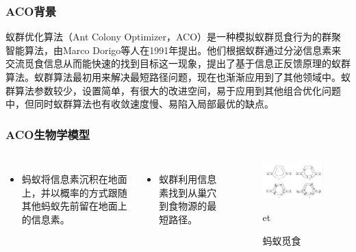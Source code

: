 \begin{frame}
	\frametitle{ACO背景}
	蚁群优化算法（Ant Colony Optimizer，ACO）是一种模拟蚁群觅食行为的群聚智能算法，由Marco Dorigo等人在1991年提出。他们根据蚁群通过分泌信息素来交流觅食信息从而能快速的找到目标这一现象，提出了基于信息正反馈原理的蚁群算法。蚁群算法最初用来解决最短路径问题，现在也渐渐应用到了其他领域中。蚁群算法参数较少，设置简单，有很大的改进空间，易于应用到其他组合优化问题中，但同时蚁群算法也有收敛速度慢、易陷入局部最优的缺点。
\end{frame}


\begin{frame}
	\frametitle{ACO生物学模型}
	\begin{columns}
			\begin{itemize}
				\item{蚂蚁将信息素沉积在地面上，并以概率的方式跟随其他蚂蚁先前留在地面上的信息素。}
			\end{itemize}
			\begin{itemize}
				\item{蚁群利用信息素找到从巢穴到食物源的最短路径。}
			\end{itemize}		
			\begin{figure}
				\centering
				\includegraphics[width=8cm]{pic/ant1.png}
				\caption{蚂蚁觅食}
	et


		\end{figure}
	\end{columns}	
\end{frame}


